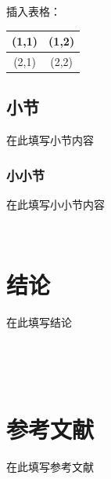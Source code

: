 \documentclass[a4paper, UTF8, fontset=adobe]{ctexart}
\begin{document}
插入表格：
\begin{tabular}{|c|c|}%
\hline  %
(1,1)&(1,2)\\
\hline  %
(2,1)&(2,2)\\
\hline %
\end{tabular}

\subsection{小节}

在此填写小节内容

\subsubsection{小小节}

在此填写小小节内容

\

\section{结论}

在此填写结论

\

\

\section*{参考文献}

在此填写参考文献
\end{document}
